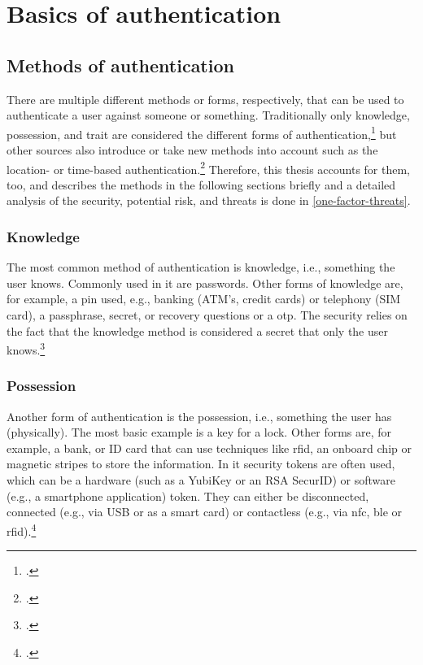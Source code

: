 \chapter{Basics of authentication}
\label{chapter:basics}

\section{Methods of authentication}
There are multiple different methods or forms, respectively, that can be used to authenticate a user against someone or something. Traditionally only knowledge, possession, and trait are considered the different forms of authentication,\footcites[See][299]{10.2307/27845364}[See][140]{brotherston2017defensive}[][47]{anderson2008security} but other sources also introduce or take new methods into account such as the location- or time-based authentication.\footcites[][]{6296127}[See][191]{dasgupta2017multi} Therefore, this thesis accounts for them, too, and describes the methods in the following sections briefly and a detailed analysis of the security, potential risk, and threats is done in \autoref{one-factor-threats}.

\subsection{Knowledge}

The most common method of authentication is knowledge, i.e., \frqq something the user knows\flqq{}. Commonly used in \gls{it} are passwords. Other forms of knowledge are, for example, a \gls{pin} used, e.g., banking (ATM's, credit cards) or telephony (SIM card), a passphrase, secret, or recovery questions or a \gls{otp}. The security relies on the fact that the knowledge method is considered a secret that only the user knows.\footcite[See][467]{eckert-it-sec-9}

\subsection{Possession}

Another form of authentication is the possession, i.e., \frqq something the user has\flqq{} (physically). The most basic example is a key for a lock. Other forms are, for example, a bank, or ID card that can use techniques like \gls{rfid}, an onboard chip or magnetic stripes to store the information. In \gls{it} security tokens are often used, which can be a hardware (such as a YubiKey or an RSA SecurID) or software (e.g., a smartphone application) token. They can either be disconnected, connected (e.g., via USB or as a smart card) or contactless (e.g., via \gls{nfc}, \gls{ble} or \gls{rfid}).\footcites[See][24]{265831}[][]{Dressel:2019:SZT:3319499.3328225}[See][8--11]{1698485}


